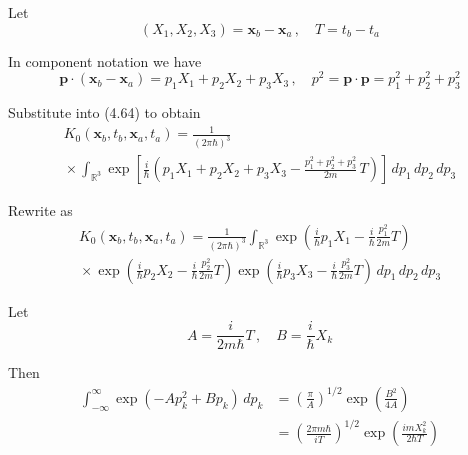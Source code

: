 


Let
\begin{equation*}
(X_1,X_2,X_3)=\mathbf x_b-\mathbf x_a\,, %
\quad
T=t_b-t_a
\end{equation*}

In component notation we have
\begin{equation*}
\mathbf p\cdot(\mathbf x_b-\mathbf x_a)=p_1X_1+p_2X_2+p_3X_3\,, %
\quad
p^2=\mathbf p\cdot\mathbf p=p_1^2+p_2^2+p_3^2
\end{equation*}

Substitute into (4.64) to obtain
\begin{multline*}
K_0(\mathbf x_b,t_b,\mathbf x_a,t_a)=\frac{1}{(2\pi\hbar)^3}
\\
{}\times\int_{\mathbb R^3}
\exp\left[\frac{i}{\hbar}\left(
p_1X_1+p_2X_2+p_3X_3-\frac{p_1^2+p_2^2+p_3^2}{2m}\,T
\right)\right]
\,dp_1\,dp_2\,dp_3
\end{multline*}

Rewrite as
\begin{multline*}
K_0(\mathbf x_b,t_b,\mathbf x_a,t_a)=\frac{1}{(2\pi\hbar)^3}\int_{\mathbb R^3}
\exp\left(\frac{i}{\hbar}p_1X_1-\frac{i}{\hbar}\frac{p_1^2}{2m}T\right)
\\
{}\times
\exp\left(\frac{i}{\hbar}p_2X_2-\frac{i}{\hbar}\frac{p_2^2}{2m}T\right)
\exp\left(\frac{i}{\hbar}p_3X_3-\frac{i}{\hbar}\frac{p_3^2}{2m}T\right)
\,dp_1\,dp_2\,dp_3
\end{multline*}

Let
\begin{equation*}
A=\frac{i}{2m\hbar}T\,, %
\quad
B=\frac{i}{\hbar}X_k
\end{equation*}

Then
\begin{align*}
\int_{-\infty}^\infty\exp(-Ap_k^2+Bp_k)\,dp_k
&=\left(\frac{\pi}{A}\right)^{1/2}\exp\left(\frac{B^2}{4A}\right)
\\
&=\left(\frac{2\pi m\hbar}{iT}\right)^{1/2}
\exp\left(\frac{imX_k^2}{2\hbar T}\right)
\tag{1}
\end{align*}

